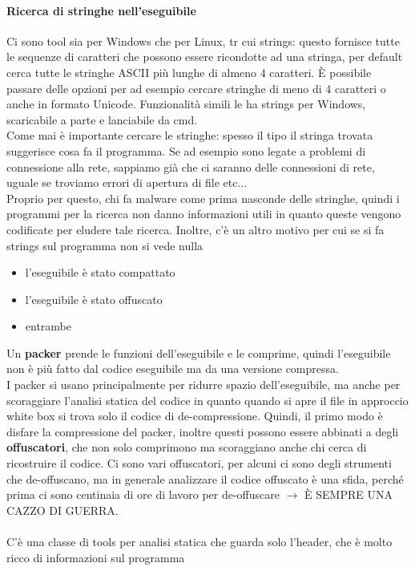 \documentclass[12pt, oneside]{extbook}
\begin{document}
\paragraph{Ricerca di stringhe nell'eseguibile} Ci sono tool sia per Windows che per Linux, tr cui \textsf{strings}: questo fornisce tutte le sequenze di caratteri che possono essere ricondotte ad una stringa, per default cerca tutte le stringhe ASCII più lunghe di almeno 4 caratteri. È possibile passare delle opzioni per ad esempio cercare stringhe di meno di 4 caratteri o anche in formato Unicode. Funzionalità simili le ha strings per Windows, scaricabile a parte e lanciabile da cmd.\\ Come mai è importante cercare le stringhe: spesso il tipo il stringa trovata suggerisce cosa fa il programma. Se ad esempio sono legate a problemi di connessione alla rete, sappiamo già che ci saranno delle connessioni di rete, uguale se troviamo errori di apertura di file etc...\\ Proprio per questo, chi fa malware come prima nasconde delle stringhe, quindi i programmi per la ricerca non danno informazioni utili in quanto queste vengono codificate per eludere tale ricerca. Inoltre, c'è un altro motivo per cui se si fa strings sul programma non si vede nulla
\begin{itemize}
\item l'eseguibile è stato compattato
\item l'eseguibile è stato offuscato
\item entrambe
\end{itemize}
Un \textbf{packer} prende le funzioni dell'eseguibile e le comprime, quindi l'eseguibile non è più fatto dal codice eseguibile ma da una versione compressa.\\ I packer si usano principalmente per ridurre spazio dell'eseguibile, ma anche per scoraggiare l'analisi statica del codice in quanto quando si apre il file in approccio white box si trova solo il codice di de-compressione. Quindi, il primo modo è disfare la compressione del packer, inoltre questi possono essere abbinati a degli \textbf{offuscatori}, che non solo comprimono ma scoraggiano anche chi cerca di ricostruire il codice. Ci sono vari offuscatori, per alcuni ci sono degli strumenti che de-offuscano, ma in generale analizzare il codice offuscato è una sfida, perché prima ci sono centinaia di ore di lavoro per de-offuscare $\rightarrow$ È SEMPRE UNA CAZZO DI GUERRA.\\\\
C'è una classe di tools per analisi statica che guarda solo l'header, che è molto ricco di informazioni sul programma
\\
\end{document}
